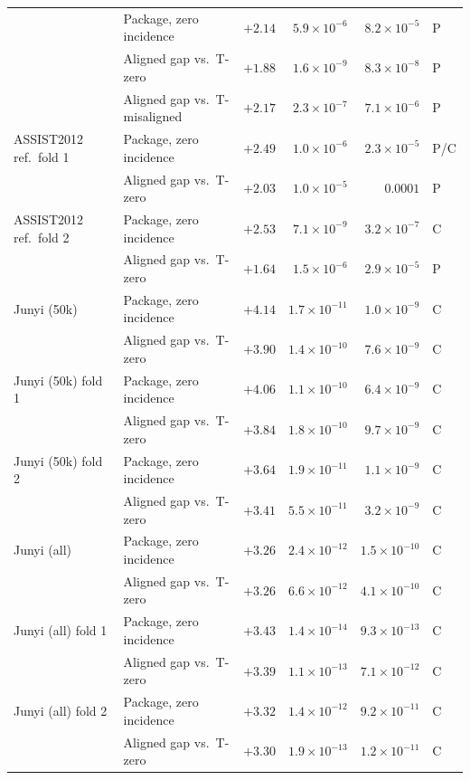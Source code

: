 \begin{table}[tbp]
\begin{tabular}{@{}llrrrl@{}}
 & Package, zero incidence & $+2.14$ & $5.9\times10^{-6}$ & $8.2\times10^{-5}$ & P \\
 & Aligned gap vs.\ T-zero & $+1.88$ & $1.6\times10^{-9}$ & $8.3\times10^{-8}$ & P \\
 & Aligned gap vs.\ T-misaligned & $+2.17$ & $2.3\times10^{-7}$ & $7.1\times10^{-6}$ & P \\
\addlinespace
ASSIST2012 ref.\ fold 1 & Package, zero incidence & $+2.49$ & $1.0\times10^{-6}$ & $2.3\times10^{-5}$ & P/C \\
 & Aligned gap vs.\ T-zero & $+2.03$ & $1.0\times10^{-5}$ & $0.0001$ & P \\
\addlinespace
ASSIST2012 ref.\ fold 2 & Package, zero incidence & $+2.53$ & $7.1\times10^{-9}$ & $3.2\times10^{-7}$ & C \\
 & Aligned gap vs.\ T-zero & $+1.64$ & $1.5\times10^{-6}$ & $2.9\times10^{-5}$ & P \\
\addlinespace
Junyi (50k) & Package, zero incidence & $+4.14$ & $1.7\times10^{-11}$ & $1.0\times10^{-9}$ & C \\
 & Aligned gap vs.\ T-zero & $+3.90$ & $1.4\times10^{-10}$ & $7.6\times10^{-9}$ & C \\
\addlinespace
Junyi (50k) fold 1 & Package, zero incidence & $+4.06$ & $1.1\times10^{-10}$ & $6.4\times10^{-9}$ & C \\
 & Aligned gap vs.\ T-zero & $+3.84$ & $1.8\times10^{-10}$ & $9.7\times10^{-9}$ & C \\
\addlinespace
Junyi (50k) fold 2 & Package, zero incidence & $+3.64$ & $1.9\times10^{-11}$ & $1.1\times10^{-9}$ & C \\
 & Aligned gap vs.\ T-zero & $+3.41$ & $5.5\times10^{-11}$ & $3.2\times10^{-9}$ & C \\
\addlinespace
Junyi (all) & Package, zero incidence & $+3.26$ & $2.4\times10^{-12}$ & $1.5\times10^{-10}$ & C \\
 & Aligned gap vs.\ T-zero & $+3.26$ & $6.6\times10^{-12}$ & $4.1\times10^{-10}$ & C \\
\addlinespace
Junyi (all) fold 1 & Package, zero incidence & $+3.43$ & $1.4\times10^{-14}$ & $9.3\times10^{-13}$ & C \\
 & Aligned gap vs.\ T-zero & $+3.39$ & $1.1\times10^{-13}$ & $7.1\times10^{-12}$ & C \\
\addlinespace
Junyi (all) fold 2 & Package, zero incidence & $+3.32$ & $1.4\times10^{-12}$ & $9.2\times10^{-11}$ & C \\
 & Aligned gap vs.\ T-zero & $+3.30$ & $1.9\times10^{-13}$ & $1.2\times10^{-11}$ & C \\
\bottomrule
\end{tabular}
\end{table}
